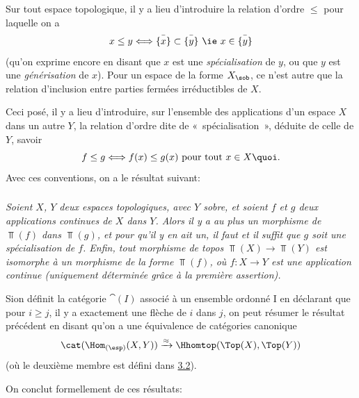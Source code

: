 \documentclass[10pt]{../fichiers-configuration-latex/smfart}
\begin{document}
\subsubsection{}
Sur tout espace topologique, il y a lieu d'introduire la relation
d'ordre $\leq$ pour laquelle on a
$$
x\leq y\Longleftrightarrow \bar{\{x\}}\subset \bar{\{y\}}\mbox{ \ie
} x\in \bar{\{y\}}
$$
(qu'on exprime encore en disant que $x$ est une
\emph{spécialisation} de $y$, ou que $y$ est une
\emph{générisation} de $x$). Pour un espace de la forme
$X_{\sob}$, ce n'est autre que la relation d'inclusion entre parties
fermées irréductibles de $X$.

Ceci posé, il y a lieu d'introduire, sur l'ensemble des
applications d'un espace $X$ dans un autre $Y$, la relation d'ordre
dite de « spécialisation », déduite de celle de $Y$, savoir
$$
f\leq g\Longleftrightarrow f(x)\leq g(x)\mbox{ pour tout } x\in
X{\quoi}.
$$
Avec ces conventions, on a le résultat suivant:

\subsubsection{}
\emph{Soient $X$, $Y$ deux espaces topologiques, avec $Y$ sobre, et
soient $f$ et $g$ deux applications continues de $X$ dans $Y$. Alors
il y a au plus un morphisme de $\Top(f)$ dans $\Top(g)$, et pour
qu'il y en ait un, il faut et il suffit que $g$ soit une
spécialisation de $f$. Enfin, tout morphisme de topos
$\Top(X)\rightarrow \Top(Y)$ est isomorphe à un morphisme de la
forme $\Top(f)$, où $f:X\rightarrow Y$ est une application
continue (uniquement déterminée grâce à la première assertion).}

Si\pageoriginale on définit la catégorie $\cat(I)$ associé à
un ensemble ordonné I en déclarant que pour $i\geq j$, il y a
exactement une flèche de $i$ dans $j$, on peut résumer le
résultat précédent en disant qu'on a une équivalence de
catégories canonique
$$
\cat(\Hom_{(\esp)}(X,Y))\xrightarrow{\approx}\Hhomtop(\Top(X),\Top(Y))
$$
(où le deuxième membre est défini dans \hyperref[IV.subsec3.2]{3.2}).

On conclut formellement de ces résultats:
\end{document}
